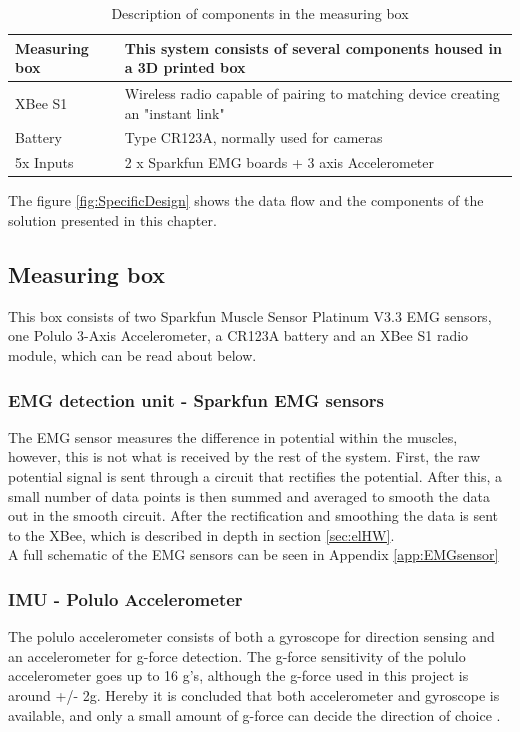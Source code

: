 \begin{table}[H]
\begin{tabular}{|P{3cm}||P{10cm}|}
\hline
\textbf{Measuring box} & This system consists of several components housed in a 3D printed box   \\ \hline
XBee S1                  & Wireless radio capable of pairing to matching device creating an "instant link" \\ \hline
Battery                  & Type CR123A, normally used for cameras                                  \\ \hline
5x Inputs                & 2 x Sparkfun EMG boards + 3 axis Accelerometer                         \\ \hline
\end{tabular}%
\caption{Description of components in the measuring box}
\label{tableBOX}
\end{table}
\noindent
The figure \ref{fig:SpecificDesign} shows the data flow and the components of the solution presented in this chapter.

\subsection*{Measuring box}
This box consists of two Sparkfun Muscle Sensor Platinum V3.3 EMG sensors, one Polulo 3-Axis Accelerometer, a CR123A battery and an XBee S1 radio module, which can be read about below.

\subsubsection*{EMG detection unit - Sparkfun EMG sensors}
The EMG sensor measures the difference in potential within the muscles, however, this is not what is received by the rest of the system. First, the raw potential signal is sent through a circuit that rectifies the potential. After this, a small number of data points is then summed and averaged to smooth the data out in the smooth circuit. After the rectification and smoothing the data is sent to the XBee, which is described in depth in section \ref{sec:elHW}.\\
A full schematic of the EMG sensors can be seen in Appendix \ref{app:EMGsensor}

\subsubsection*{IMU - Polulo Accelerometer}
The polulo accelerometer consists of both a gyroscope for direction sensing and an accelerometer for g-force detection. The g-force sensitivity of the polulo accelerometer goes up to 16 g's, although the g-force used in this project is around +/- 2g. Hereby it is concluded that both accelerometer and gyroscope is available, and only a small amount of g-force can decide the direction of choice \cite{Acceleration}.

